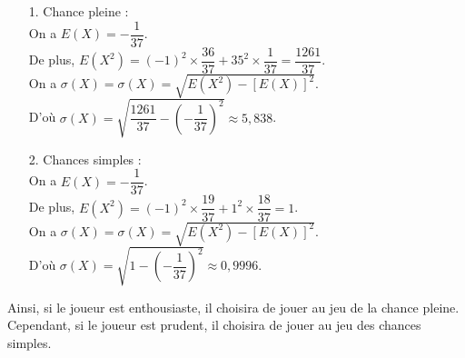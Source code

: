 \begin{itemize}
\item[1.] Chance pleine : \\

On a $E\left(X\right) = -\dfrac{1}{37}$. \vspace*{.3cm} \\

De plus, $E\left(X^2\right) = \left(-1\right)^2 \times \dfrac{36}{37} + 35^2 \times \dfrac{1}{37} = \dfrac{1261}{37}$. \vspace*{.3cm} \\

On a $\sigma\left(X\right) = \sigma\left(X\right) = \sqrt{E\left(X^2\right) - \left[E\left(X\right)\right]^2}$. \vspace*{.3cm} \\

D'où $\sigma\left(X\right) = \sqrt{\dfrac{1261}{37} - \left(-\dfrac{1}{37}\right)^2} \approx 5,838$. \\

\item[2.] Chances simples : \\

On a $E\left(X\right) = -\dfrac{1}{37}$. \vspace*{.3cm} \\

De plus, $E\left(X^2\right) = \left(-1\right)^2 \times \dfrac{19}{37} + 1^2 \times \dfrac{18}{37} = 1$. \vspace*{.3cm} \\

On a $\sigma\left(X\right) = \sigma\left(X\right) = \sqrt{E\left(X^2\right) - \left[E\left(X\right)\right]^2}$. \vspace*{.3cm} \\

D'où $\sigma\left(X\right) = \sqrt{1 - \left(-\dfrac{1}{37}\right)^2} \approx 0,9996$. \\
\end{itemize}

\vspace*{.3cm}

Ainsi, si le joueur est enthousiaste, il choisira de jouer au jeu de la chance pleine. Cependant, si le joueur est prudent, il choisira de jouer au jeu des chances simples. 


\ifdefined\COMPLETE
\else
    
\fi